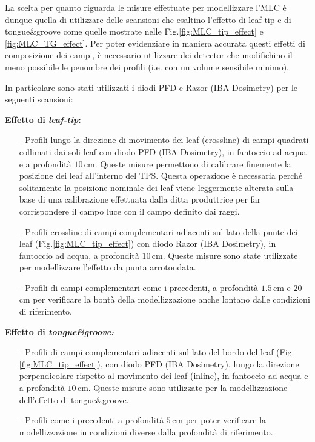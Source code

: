 La scelta per quanto riguarda le misure effettuate per modellizzare l'MLC è dunque quella di utilizzare delle scansioni che esaltino l'effetto di leaf tip e di tongue\&{}groove come quelle mostrate nelle Fig.\ref{fig:MLC_tip_effect} e \ref{fig:MLC_TG_effect}. Per poter evidenziare in maniera accurata questi effetti di composizione dei campi, è necessario utilizzare dei detector che modifichino il meno possibile le penombre dei profili (i.e. con un volume sensibile minimo).

In particolare sono stati utilizzati i diodi PFD e Razor (IBA Dosimetry) per le seguenti scansioni:\vspace*{.2cm}

\textbf{Effetto di \textit{leaf-tip}:}
\begin{itemize}
\item[-] Profili lungo la direzione di movimento dei leaf (crossline) di campi quadrati collimati dai soli leaf con diodo PFD (IBA Dosimetry), in fantoccio ad acqua e a profondità $10\,$cm. Queste misure permettono di calibrare finemente la posizione dei leaf all'interno del TPS. Questa operazione è necessaria perché solitamente la posizione nominale dei leaf viene leggermente alterata sulla base di una calibrazione effettuata dalla ditta produttrice per far corrispondere il campo luce con il campo definito dai raggi.
\item[-] Profili crossline di campi complementari adiacenti sul lato della punte dei leaf (Fig.\ref{fig:MLC_tip_effect}) con diodo Razor (IBA Dosimetry), in fantoccio ad acqua, a profondità $10\,$cm. Queste misure sono state utilizzate per modellizzare l'effetto da punta arrotondata.
\item[-] Profili di campi complementari come i precedenti, a profondità $1.5\,$cm e $20\,$cm per verificare la bontà della modellizzazione anche lontano dalle condizioni di riferimento.
\end{itemize}

\textbf{Effetto di \textit{tongue\&{}groove:}}
\begin{itemize}
\item[-] Profili di campi complementari adiacenti sul lato del bordo del leaf (Fig.\ref{fig:MLC_tip_effect}), con diodo PFD (IBA Dosimetry), lungo la direzione perpendicolare rispetto al movimento dei leaf (inline), in fantoccio ad acqua e a profondità $10\,$cm. Queste misure sono utilizzate per la modellizzazione dell'effetto di tongue\&{}groove.
\item[-] Profili come i precedenti a profondità $5\,$cm per poter verificare la modellizzazione in condizioni diverse dalla profondità di riferimento.
\end{itemize}




